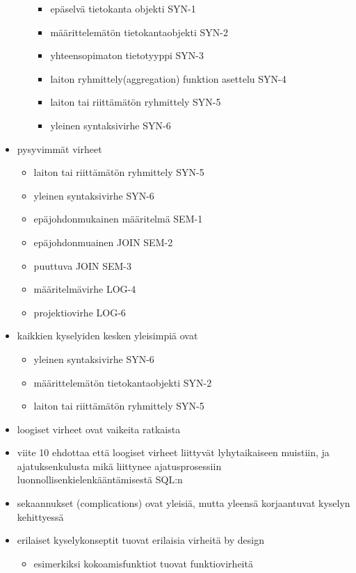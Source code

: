 \documentclass[finnish,twoside,openright]{HYgraduMLDS}
\begin{document}
\begin{itemize}
\begin{itemize}
\begin{itemize}
            \item epäselvä tietokanta objekti SYN-1
            \item määrittelemätön tietokantaobjekti SYN-2
            \item yhteensopimaton tietotyyppi SYN-3
            \item laiton ryhmittely(aggregation) funktion asettelu SYN-4
            \item laiton tai riittämätön ryhmittely SYN-5
            \item yleinen syntaksivirhe SYN-6
        \end{itemize}
    \end{itemize}
    \item pysyvimmät virheet
    \begin{itemize}
        \item laiton tai riittämätön ryhmittely SYN-5
        \item yleinen syntaksivirhe SYN-6
        \item epäjohdonmukainen määritelmä SEM-1
        \item epäjohdonmuainen JOIN SEM-2
        \item puuttuva JOIN SEM-3
        \item määritelmävirhe LOG-4
        \item projektiovirhe LOG-6
    \end{itemize}
    \item kaikkien kyselyiden kesken yleisimpiä ovat
    \begin{itemize}
        \item yleinen syntaksivirhe SYN-6
        \item määrittelemätön tietokantaobjekti SYN-2
        \item laiton tai riittämätön ryhmittely SYN-5
    \end{itemize}
    \item loogiset virheet ovat vaikeita ratkaista
    \item viite 10 ehdottaa että loogiset virheet liittyvät lyhytaikaiseen muistiin, ja ajatuksenkulusta mikä liittynee ajatusprosessiin luonnollisenkielenkääntämisestä SQL:n
    \item sekaannukset (complications) ovat yleisiä, mutta yleensä korjaantuvat kyselyn kehittyessä
    \item erilaiset kyselykonseptit tuovat erilaisia virheitä by design
    \begin{itemize}
        \item esimerkiksi kokoamisfunktiot tuovat funktiovirheitä

\end{itemize}
\end{itemize}
\end{document}
